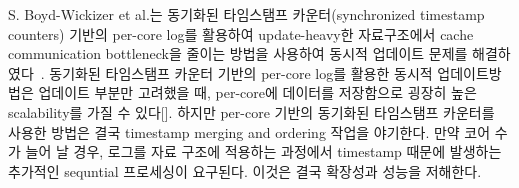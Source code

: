 \ifkor
S. Boyd-Wickizer et al.는 동기화된 타임스탬프 카운터(synchronized timestamp counters) 기반의
per-core log를 활용하여 update-heavy한 자료구조에서  cache communication bottleneck을 줄이는 방법을
사용하여 동시적 업데이트 문제를 해결하였다~\cite{SilasBoydWickizerPth}.
동기화된 타임스탬프 카운터 기반의 per-core log를 활용한 동시적 업데이트방법은
업데이트 부분만 고려했을 때, per-core에 데이터를 저장함으로 굉장히 높은 scalability를 가질
수 있다[].
하지만 per-core 기반의 동기화된 타임스탬프 카운터를 사용한 방법은 결국 timestamp merging and ordering 작업을
야기한다.
만약 코어 수가 늘어 날 경우, 로그를 자료 구조에 적용하는 과정에서 timestamp 때문에 발생하는 추가적인 sequntial 프로세싱이
요구된다.
이것은 결국 확장성과 성능을 저해한다. 
\else
\fi



